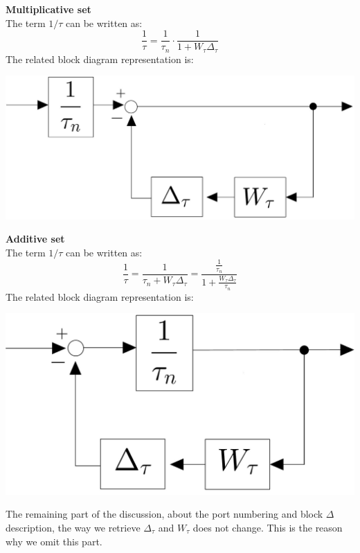 \documentclass[a4paper, 12pt]{article}
\begin{document}
\begin{multicols}{2}
    \noindent
\textbf{\textsf{Multiplicative set}}\\
The term $1/\tau$ can be written as:
\begin{equation}
    \frac{1}{\tau}=\frac{1}{\tau_n}\cdot
    \frac{1}{1+W_\tau \Delta_\tau}
\end{equation}
The related block diagram representation is:
\begin{center}
    \includegraphics[scale=0.13]{img/tau_mul.jpg}
\end{center}

\newcolumn
\noindent
\textbf{\textsf{Additive set}}\\
The term $1/\tau$ can be written as:
\begin{equation}
    \frac{1}{\tau}=\frac{1}{\tau_n+W_\tau \Delta_\tau}=
    \frac{\frac{1}{\tau_n}}{1+\frac{W_\tau \Delta_\tau}{\tau_n}}
\end{equation}
The related block diagram representation is:
\begin{center}
    \includegraphics[scale=0.11]{img/tau_add.jpg}
\end{center}
\end{multicols}
\noindent
The remaining part of the discussion, about the port numbering and block $\Delta$ description, the way we retrieve $\Delta_\tau$ and $W_\tau$ does not change. This is the reason why we omit this part.
 
\end{document}
